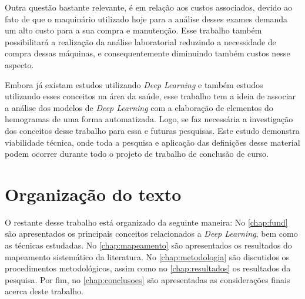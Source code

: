 Outra questão bastante relevante, é em relação aos custos associados, devido ao fato de que o maquinário utilizado hoje para a análise desses exames demanda um alto custo para a sua compra e manutenção. Esse trabalho também possibilitará a realização da análise laboratorial reduzindo a necessidade de compra dessas máquinas, e consequentemente diminuindo também custos nesse aspecto.

Embora já existam estudos utilizando \emph{Deep Learning} e também estudos utilizando esses conceitos na área da saúde, esse trabalho tem a ideia de associar a análise dos modelos de \emph{Deep Learning} com a elaboração de elementos do hemogramas de uma forma automatizada. Logo, se faz necessária a investigação dos conceitos desse trabalho para essa e futuras pesquisas. Este estudo demonstra viabilidade técnica, onde toda a pesquisa e aplicação das definições desse material podem ocorrer durante todo o projeto de trabalho de conclusão de curso.

\section{Organização do texto}
\label{sec:organizacao}
O restante desse trabalho está organizado da seguinte maneira: No \autoref{chap:fund} são apresentados os principais conceitos relacionados a \emph{Deep Learning}, bem como as técnicas estudadas. No \autoref{chap:mapeamento} são apresentados os resultados do mapeamento sistemático da literatura. No \autoref{chap:metodologia} são discutidos os procedimentos metodológicos, assim como no \autoref{chap:resultados} os resultados da pesquisa. Por fim, no \autoref{chap:conclusoes} são apresentadas as considerações finais acerca deste trabalho.
